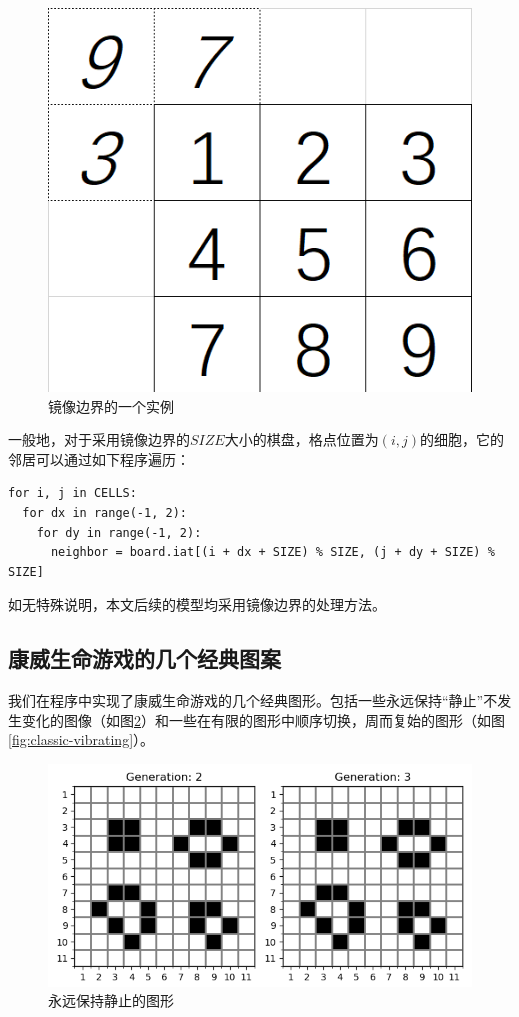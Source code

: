 \documentclass{ctexart}
\begin{document}
\begin{figure}[h]
  \centering
  \includegraphics[scale=0.75]{mirror-edge-example.png}
  \caption{镜像边界的一个实例}
  \label{fig:mirror-edge-example}
\end{figure}

一般地，对于采用镜像边界的$SIZE$大小的棋盘，格点位置为$(i, j)$的细胞，它的邻居可以通过如下程序遍历：

\begin{lstlisting}[style = python]
for i, j in CELLS:
  for dx in range(-1, 2):
    for dy in range(-1, 2):
      neighbor = board.iat[(i + dx + SIZE) % SIZE, (j + dy + SIZE) % SIZE]
\end{lstlisting}

如无特殊说明，本文后续的模型均采用镜像边界的处理方法。

\subsection{康威生命游戏的几个经典图案}

我们在程序中实现了康威生命游戏的几个经典图形。包括一些永远保持“静止”不发生变化的图像（如图\ref{fig:classic-fixed}）和一些在有限的图形中顺序切换，周而复始的图形（如图\ref{fig:classic-vibrating}）。

\begin{figure}[h]
  \centering
  \includegraphics[scale=0.75]{classic-fixed.png}
  \caption{永远保持静止的图形}
  \label{fig:classic-fixed}
\end{figure}
\end{document}
